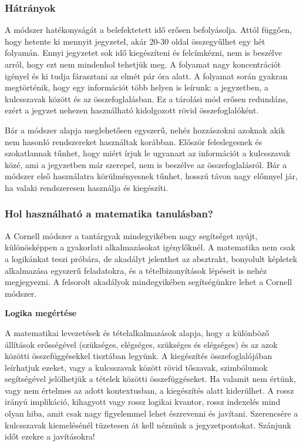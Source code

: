 \documentclass[../Main.tex]{subfiles}
\begin{document}
\subsubsection{Hátrányok}


    A módszer hatékonyságát a belefektetett idő erősen befolyásolja. Attól függően, hogy
hetente ki mennyit jegyzetel, akár 20-30 oldal összegyűlhet egy hét folyamán. Ennyi
jegyzetet sok idő kiegészíteni és felcímkézni, nem is beszélve arról, hogy ezt nem
mindenhol tehetjük meg. A folyamat nagy koncentrációt igényel és ki tudja fárasztani az
elmét pár óra alatt. A folyamat során gyakran megtörténik, hogy egy információt több
helyen is leírunk: a jegyzetben, a kulcsszavak között és az összefoglalásban. Ez a tárolási
mód erősen redundáns, ezért a jegyzet nehezen használható kidolgozott rövid
összefoglalóként.

Bár a módszer alapja meglehetősen egyszerű, nehéz hozzászokni azoknak akik nem
hasonló rendszereket használtak korábban. Először feleslegesnek és szokatlannak tűnhet,
hogy miért írjuk le ugyanazt az információt a kulcsszavak közé, ami a jegyzetben már
szerepel, nem is beszélve az összefoglalásról. Bár a módszer első használatra
körülményesnek tűnhet, hosszú távon nagy előnnyel jár, ha valaki rendszeresen használja
és kiegészíti.


\subsubsection{Hol használható a matematika tanulásban?}


A Cornell módszer a tantárgyak mindegyikében nagy segítséget nyújt, különösképpen a
gyakorlati alkalmazásokat igénylőknél. A matematika nem csak a logikánkat teszi próbára,
de akadályt jelenthet az absztrakt, bonyolult képletek alkalmazása egyszerű feladatokra, és
a tételbizonyítások lépéseit is nehéz megjegyezni. A felsorolt akadályok mindegyikében
segítségünkre lehet a Cornell módszer.

\textbf{Logika megértése}



    A matematikai levezetések és tételalkalmazások alapja, hogy a különböző állítások
erősségével (szükséges, elégséges, szükséges és elégséges) és az azok közötti
összefüggésekkel tisztában legyünk. A kiegészítés összefoglalójában leírhatjuk ezeket,
vagy a kulcsszavak között rövid tőszavak, szimbólumok segítségével jelölhetjük a tételek
közötti összefüggéseket. Ha valamit nem értünk, vagy nem értelmes az adott
kontextusban, a kiegészítés alatt kiderülhet. A rossz irányú implikáció, kihagyott vagy
rossz logikai kvantor, rossz indexelés mind olyan hiba, amit csak nagy figyelemmel lehet
észrevenni és javítani. Szerencsére a kulcsszavak kiemelésénél tüzetesen át kell néznünk a
jegyzetpontokat. Szánjunk időt ezekre a javításokra!
\end{document}
